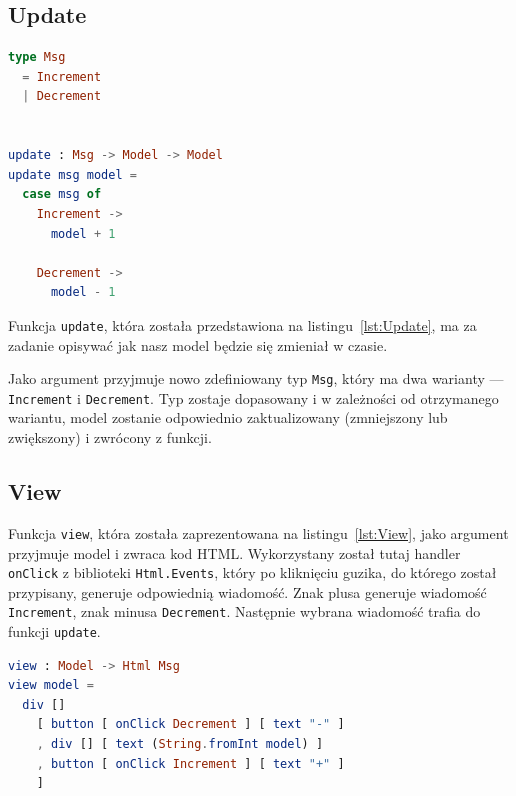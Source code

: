 \documentclass[twoside,a4paper]{report}
\begin{document}
\subsection{Update}
\begin{minipage}{.43\textwidth}
    \begin{lstlisting}[caption={\textit{The Elm Architecture} --- Update},label={lst:Update},language={Elm}]
type Msg
  = Increment
  | Decrement


update : Msg -> Model -> Model
update msg model =
  case msg of
    Increment ->
      model + 1

    Decrement ->
      model - 1
    \end{lstlisting}
\end{minipage}\hfill
\begin{minipage}{.50\textwidth}
    Funkcja \texttt{update}, która została przedstawiona na listingu~\ref{lst:Update}, ma za zadanie opisywać jak nasz model będzie się zmieniał w czasie.

    Jako argument przyjmuje nowo zdefiniowany typ \texttt{Msg}, który ma dwa warianty --- \texttt{Increment} i \texttt{Decrement}. Typ zostaje dopasowany i w zależności od otrzymanego wariantu, model zostanie odpowiednio zaktualizowany (zmniejszony lub zwiększony) i zwrócony z funkcji.
\end{minipage}\hfill
\subsection{View}
Funkcja \texttt{view}, która została zaprezentowana na listingu~\ref{lst:View}, jako argument przyjmuje model i zwraca kod HTML\@.
Wykorzystany został tutaj handler \texttt{onClick} z biblioteki \texttt{Html.Events}, który po kliknięciu guzika, do którego został przypisany, generuje odpowiednią wiadomość.
Znak plusa generuje wiadomość \texttt{Increment}, znak minusa \texttt{Decrement}.
Następnie wybrana wiadomość trafia do funkcji \texttt{update}.

\begin{lstlisting}[caption={\textit{The Elm Architecture} --- View},label={lst:View},language={Elm}]
view : Model -> Html Msg
view model =
  div []
    [ button [ onClick Decrement ] [ text "-" ]
    , div [] [ text (String.fromInt model) ]
    , button [ onClick Increment ] [ text "+" ]
    ]
\end{lstlisting}
\end{document}
